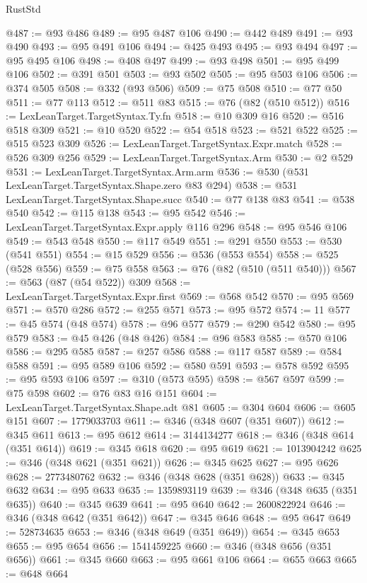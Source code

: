 \begin{lexlean}{RustStd}
\begin{coremodule}
@487 := @93 @486
@489 := @95 @487 @106
@490 := @442 @489
@491 := @93 @490
@493 := @95 @491 @106
@494 := @425 @493
@495 := @93 @494
@497 := @95 @495 @106
@498 := @408 @497
@499 := @93 @498
@501 := @95 @499 @106
@502 := @391 @501
@503 := @93 @502
@505 := @95 @503 @106
@506 := @374 @505
@508 := @332 (@93 @506)
@509 := @75 @508
@510 := @77 @50
@511 := @77 @113
@512 := @511 @83
@515 := @76 (@82 (@510 @512))
@516 := LexLeanTarget.TargetSyntax.Ty.fn
@518 := @10 @309 @16
@520 := @516 @518 @309
@521 := @10 @520
@522 := @54 @518
@523 := @521 @522
@525 := @515 @523 @309
@526 := LexLeanTarget.TargetSyntax.Expr.match
@528 := @526 @309 @256
@529 := LexLeanTarget.TargetSyntax.Arm
@530 := @2 @529
@531 := LexLeanTarget.TargetSyntax.Arm.arm
@536 := @530 (@531 LexLeanTarget.TargetSyntax.Shape.zero @83 @294)
@538 := @531 LexLeanTarget.TargetSyntax.Shape.succ
@540 := @77 @138 @83
@541 := @538 @540
@542 := @115 @138
@543 := @95 @542
@546 := LexLeanTarget.TargetSyntax.Expr.apply @116 @296
@548 := @95 @546 @106
@549 := @543 @548
@550 := @117 @549
@551 := @291 @550
@553 := @530 (@541 @551)
@554 := @15 @529
@556 := @536 (@553 @554)
@558 := @525 (@528 @556)
@559 := @75 @558
@563 := @76 (@82 (@510 (@511 @540)))
@567 := @563 (@87 (@54 @522)) @309
@568 := LexLeanTarget.TargetSyntax.Expr.first
@569 := @568 @542
@570 := @95 @569
@571 := @570 @286
@572 := @255 @571
@573 := @95 @572
@574 := 11
@577 := @45 @574 (@48 @574)
@578 := @96 @577
@579 := @290 @542
@580 := @95 @579
@583 := @45 @426 (@48 @426)
@584 := @96 @583
@585 := @570 @106
@586 := @295 @585
@587 := @257 @586
@588 := @117 @587
@589 := @584 @588
@591 := @95 @589 @106
@592 := @580 @591
@593 := @578 @592
@595 := @95 @593 @106
@597 := @310 (@573 @595)
@598 := @567 @597
@599 := @75 @598
@602 := @76 @83 @16 @151
@604 := LexLeanTarget.TargetSyntax.Shape.adt @81
@605 := @304 @604
@606 := @605 @151
@607 := 1779033703
@611 := @346 (@348 @607 (@351 @607))
@612 := @345 @611
@613 := @95 @612
@614 := 3144134277
@618 := @346 (@348 @614 (@351 @614))
@619 := @345 @618
@620 := @95 @619
@621 := 1013904242
@625 := @346 (@348 @621 (@351 @621))
@626 := @345 @625
@627 := @95 @626
@628 := 2773480762
@632 := @346 (@348 @628 (@351 @628))
@633 := @345 @632
@634 := @95 @633
@635 := 1359893119
@639 := @346 (@348 @635 (@351 @635))
@640 := @345 @639
@641 := @95 @640
@642 := 2600822924
@646 := @346 (@348 @642 (@351 @642))
@647 := @345 @646
@648 := @95 @647
@649 := 528734635
@653 := @346 (@348 @649 (@351 @649))
@654 := @345 @653
@655 := @95 @654
@656 := 1541459225
@660 := @346 (@348 @656 (@351 @656))
@661 := @345 @660
@663 := @95 @661 @106
@664 := @655 @663
@665 := @648 @664

\end{coremodule}
\end{lexlean}
